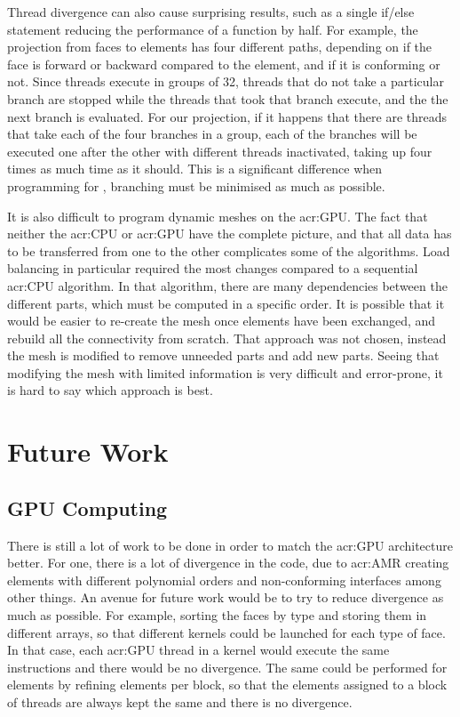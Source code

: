 Thread divergence can also cause surprising results, such as a single if/else statement reducing the
performance of a function by half. For example, the projection from faces to elements has four
different paths, depending on if the face is forward or backward compared to the element, and if it
is conforming or not. Since threads execute in groups of 32, threads that do not take a particular
branch are stopped while the threads that took that branch execute, and the the next branch is
evaluated. For our projection, if it happens that there are threads that take each of the four
branches in a group, each of the branches will be executed one after the other with different
threads inactivated, taking up four times as much time as it should. This is a significant
difference when programming for , branching must be minimised as much as
possible.

It is also difficult to program dynamic meshes on the \acrshort{acr:GPU}. The fact that neither the
\acrshort{acr:CPU} or \acrshort{acr:GPU} have the complete picture, and that all data has to be
transferred from one to the other complicates some of the algorithms. Load balancing in particular
required the most changes compared to a sequential \acrshort{acr:CPU} algorithm. In that algorithm,
there are many dependencies between the different parts, which must be computed in a specific order.
It is possible that it would be easier to re-create the mesh once elements have been exchanged, and
rebuild all the connectivity from scratch. That approach was not chosen, instead the mesh is
modified to remove unneeded parts and add new parts. Seeing that modifying the mesh with limited
information is very difficult and error-prone, it is hard to say which approach is best.

\section{Future Work}\label{section:conclusion:future_work}

\subsection{GPU Computing}\label{subsection:conclusion:future_work:gpu}

There is still a lot of work to be done in order to match the \acrshort{acr:GPU} architecture
better. For one, there is a lot of divergence in the code, due to \acrshort{acr:AMR} creating
elements with different polynomial orders and non-conforming interfaces among other things. An
avenue for future work would be to try to reduce divergence as much as possible. For example,
sorting the faces by type and storing them in different arrays, so that different kernels could be
launched for each type of face. In that case, each \acrshort{acr:GPU} thread in a kernel would
execute the same instructions and there would be no divergence. The same could be performed for
elements by refining elements per block, so that the elements assigned to a block of threads are
always kept the same and there is no divergence.

